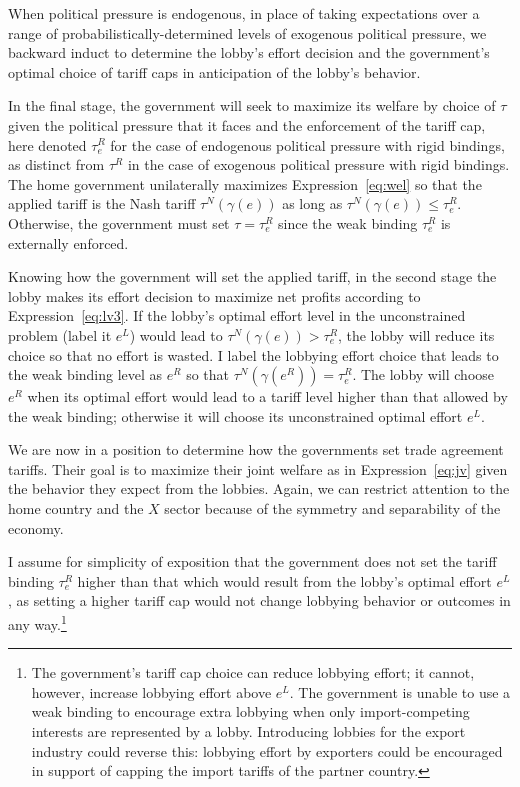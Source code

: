\documentclass[12pt,titlepage]{article}
\newcommand{\ga}{\gamma}
\begin{document}
When political pressure is endogenous, in place of taking expectations over a range of probabilistically-determined levels of exogenous political pressure, we backward induct to determine the lobby's effort decision and the government's optimal choice of tariff caps in anticipation of the lobby's behavior.

In the final stage, the government will seek to maximize its welfare by choice of $\tau$ given the political pressure that it faces and the enforcement of the tariff cap, here denoted $\tau_e^R$ for the case of endogenous political pressure with rigid bindings, as distinct from $\tau^R$ in the case of exogenous political pressure with rigid bindings. The home government unilaterally maximizes Expression~\ref{eq:wel} so that the applied tariff is the Nash tariff $\tau^N(\ga(e))$ as long as $\tau^N(\ga(e)) \leq \tau_e^R$. Otherwise, the government must set $\tau = \tau_e^R$ since the weak binding $\tau_e^R$ is externally enforced.

Knowing how the government will set the applied tariff, in the second stage the lobby makes its effort decision to maximize net profits according to Expression~\ref{eq:lv3}. If the lobby's optimal effort level in the unconstrained problem (label it $e^L$) would lead to $\tau^N(\ga(e)) > \tau_e^R$, the lobby will reduce its choice so that no effort is wasted. I label the lobbying effort choice that leads to the weak binding level as $e^R$ so that $\tau^N(\ga(e^R)) = \tau_e^R$. The lobby will choose $e^R$ when its optimal effort would lead to a tariff level higher than that allowed by the weak binding; otherwise it will choose its unconstrained optimal effort $e^L$. 

We are now in a position to determine how the governments set trade agreement tariffs. Their goal is to maximize their joint welfare as in Expression~\ref{eq:jv} given the behavior they expect from the lobbies. Again, we can restrict attention to the home country and the $X$ sector because of the symmetry and separability of the economy.

I assume for simplicity of exposition that the government does not set the tariff binding $\tau_e^R$ higher than that which would result from the lobby's optimal effort $e^L$, as setting a higher tariff cap would not change lobbying behavior or outcomes in any way.\footnote{The government's tariff cap choice can reduce lobbying effort; it cannot, however, increase lobbying effort above $e^L$. The government is unable to use a weak binding to encourage extra lobbying when only import-competing interests are represented by a lobby. Introducing lobbies for the export industry could reverse this: lobbying effort by exporters could be encouraged in support of capping the import tariffs of the partner country.}
\end{document}
